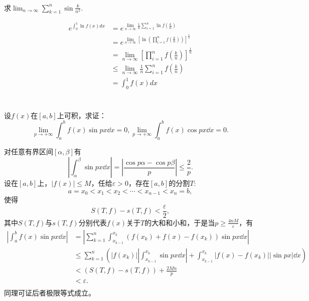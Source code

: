 \begin{example}
\hfill\\
 求$\displaystyle\lim_{n\rightarrow\infty}\sum_{k=1}^n\sin\frac k{n^2}$.

  \begin{equation*}
  \begin{aligned}
  e^{\int_0^1\ln f(x)dx}&=\displaystyle e^{\lim_{n\rightarrow\infty}\frac1n\sum_{i=1}^n\ln f(\frac kn)}\\
  &=e^{\lim_{n\rightarrow\infty}[\ln(\prod_{i=1}^nf(\frac kn))]^{\frac1n}}\\
  &=\lim_{n\rightarrow\infty}[\prod_{i=1}^nf(\frac kn)]^{\frac1n}\\
  &\leq\lim_{n\rightarrow\infty}\frac1n\sum_{i=1}^nf(\frac kn)\\
  &=\int_0^1f(x)dx\\
  \end{aligned}
  \end{equation*}
\end{example}
\begin{example}
\hfill\\
 设$f(x)$在$[a,b]$上可积，求证：$$\displaystyle\lim_{p\rightarrow+\infty}\int_a^bf(x)\sin px\dd x=0,\lim_{p\rightarrow+\infty}\int_a^bf(x)\cos px\dd x=0.$$
 
 对任意有界区间$[\alpha,\beta]$有$$|\int_{\alpha}^{\beta}\sin px\dd x|=|\frac{\cos p\alpha-\cos p\beta}{p}|\leq\frac{2}{p}.$$
设在$[a,b]$上，$|f(x)|\leq M$，任给$\varepsilon>0$，存在$[a,b]$的分割$T$:
$$a=x_0<x_1<x_2<\cdots<x_{n-1}<x_n=b,$$
使得
$$S(T,f)-s(T,f)<\frac{\varepsilon}{2},$$
其中$S(T,f)$与$s(T,f)$分别代表$f(x)$关于$T$的大和和小和，于是当$p\geq\frac{4nM}{\varepsilon}$，有
\begin{align*}
|\int_a^bf(x)\sin px\dd x|&=
|\sum_{k=1}^n\int_{x_{k-1}}^{x_k}(f(x_k)+f(x)-f(x_k))\sin px\dd x|\\
&\leq\sum_{k=1}^n(|f(x_k)||\int_{x_{k-1}}^{x_k}\sin px\dd x|+\int_{x_{k-1}}^{x_k}|f(x)-f(x_k)||\sin px|\dd x)\\
&<(S(T,f)-s(T,f))+\frac{2Mn}{p}\\
&<\varepsilon.\\
\end{align*}
同理可证后者极限等式成立。
\end{example}

